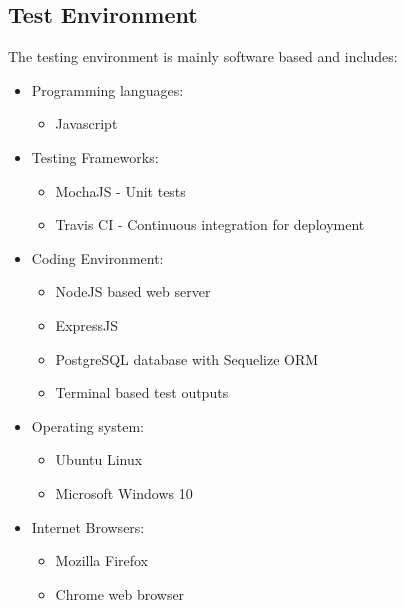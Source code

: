\documentclass{article}
\begin{document}
\subsection{Test Environment}\label{subsec:testEnvironment}
The testing environment is mainly software based and includes:
\begin{itemize}
	\item Programming languages:
	\begin{itemize}
		\item Javascript 
	\end{itemize}
	\item Testing Frameworks:
	\begin{itemize}
		\item MochaJS - Unit tests
		\item Travis CI - Continuous integration for deployment
	\end{itemize}
	\item Coding Environment:
	\begin{itemize}
		\item NodeJS based web server
		\item ExpressJS
		\item PostgreSQL database with Sequelize ORM
		\item Terminal based test outputs
	\end{itemize}
	\item Operating system:
	\begin{itemize}
		\item Ubuntu Linux
		\item Microsoft Windows 10
	\end{itemize}
	\item Internet Browsers:
	\begin{itemize}
		\item Mozilla Firefox
		\item Chrome web browser
	\end{itemize}
\end{itemize}
\end{document}
